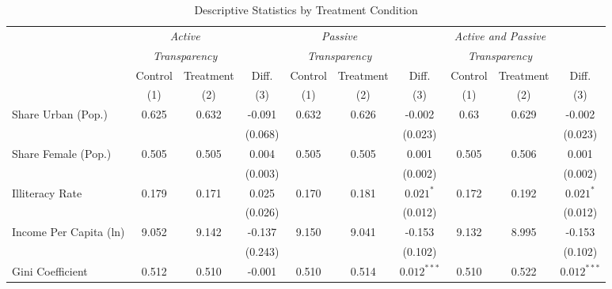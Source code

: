 \begin{table}[!htbp]
\centering
\caption{Descriptive Statistics by Treatment Condition}
\label{tab:descriptivestats3}
\scriptsize
\begin{tabular}{@{\extracolsep{-4pt}}l@{\extracolsep{-3pt}}ccccccccc}
\hline
\hline
& \multicolumn{2}{c}{\emph{Active}} & & \multicolumn{2}{c}{\emph{Passive}} & & \multicolumn{2}{c}{\emph{Active and Passive}} \T \\
& \multicolumn{2}{c}{\emph{Transparency}} & & \multicolumn{2}{c}{\emph{Transparency}} & & \multicolumn{2}{c}{\emph{Transparency}} \B \\
\cline{2-3} \cline{5-6} \cline{8-9}
& Control & Treatment & Diff. & Control & Treatment & Diff. & Control & Treatment & Diff. \T \B \\
& (1) & (2) & (3) & (1) & (2) & (3) & (1) & (2) & (3) \B \\
\hline
Share Urban (Pop.)                    & 0.625 & 0.632 & -0.091       & 0.632 & 0.626 & -0.002          & 0.63 & 0.629 & -0.002  \T    \\
                                      &       &       & (0.068)      &       &       & (0.023)         &      &       & (0.023)       \\
Share Female (Pop.)                   & 0.505 & 0.505 & 0.004        & 0.505 & 0.505 & 0.001           & 0.505& 0.506 & 0.001         \\
                                      &       &       & (0.003)      &       &       & (0.002)         &      &       & (0.002)       \\
Illiteracy Rate                       & 0.179 & 0.171 & 0.025        & 0.170 & 0.181 & $0.021^{*}$     & 0.172& 0.192 & $0.021^{*}$   \\
                                      &       &       & (0.026)      &       &       & (0.012)         &      &       & (0.012)       \\
Income Per Capita (ln)                & 9.052 & 9.142 & -0.137       & 9.150 & 9.041 & -0.153          & 9.132& 8.995 & -0.153        \\
                                      &       &       & (0.243)      &       &       & (0.102)         &      &       & (0.102)       \\
Gini Coefficient                      & 0.512 & 0.510 & -0.001       & 0.510 & 0.514 & $0.012^{***}$   & 0.510& 0.522 & $0.012^{***}$ \\

\end{tabular}
\end{table}
